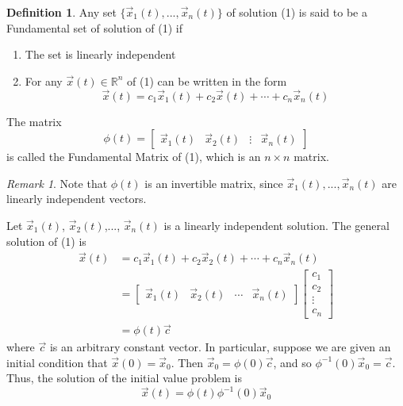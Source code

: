 \documentclass[11pt]{article}
\theoremstyle{definition}\newtheorem{definition}{Definition}
\theoremstyle{definition}\newtheorem{notation}{Notation}
\theoremstyle{definition}\newtheorem{example}{Example}
\theoremstyle{theorem}\newtheorem{theorem}{Theorem}
\theoremstyle{theorem}\newtheorem{corollary}{Corollary}
\theoremstyle{theorem}\newtheorem{proposition}{Proposition}
\theoremstyle{theorem}\newtheorem{lemma}{Lemma}
\theoremstyle{theorem}\newtheorem{question}{Question}
\theoremstyle{remark}\newtheorem{remark}{Remark}
\newcommand{\R}{\mathbb{R}}
\begin{document}
\begin{definition}
    Any set $\{\vec{x}_1(t),..., \vec{x}_n(t)\}$ of solution (1) is said to be a Fundamental set of solution of (1) if
    \begin{enumerate}
        \item The set is linearly independent
        \item For any $\vec{x}(t) \in \R^n$ of (1) can be written in the form
        \begin{equation*}
            \vec{x}(t) = c_1\vec{x}_1(t) + c_2\vec{x}(t) + \cdots + c_n\vec{x}_n(t)
        \end{equation*}
    \end{enumerate}
\end{definition}
The matrix
\begin{equation*}
    \phi(t) = \begin{bmatrix}
        \vec{x}_1(t) & \vec{x}_2(t) & \vdots & \vec{x}_n(t)
    \end{bmatrix}
\end{equation*}
is called the Fundamental Matrix of (1), which is an $n \times n$ matrix.

\begin{remark}
    Note that $\phi(t)$ is an invertible matrix, since $\vec{x}_1(t),..., \vec{x}_n(t)$ are linearly independent vectors.
\end{remark}

Let $\vec{x}_1(t)$, $\vec{x}_2(t)$,..., $\vec{x}_n(t)$ is a linearly independent solution. The general solution of (1) is
\begin{align*}
    \vec{x}(t) &= c_1\vec{x}_1(t) + c_2\vec{x}_2(t) + \cdots + c_n\vec{x}_n(t) \\
    &= \begin{bmatrix} \vec{x}_1(t) & \vec{x}_2(t) & \cdots & \vec{x}_n(t) \end{bmatrix} \begin{bmatrix} c_1 \\ c_2 \\ \vdots \\ c_n \end{bmatrix} \\
    &= \phi(t)\vec{c}
\end{align*}
where $\vec{c}$ is an arbitrary constant vector. In particular, suppose we are given an initial condition that $\vec{x}(0) = \vec{x}_0$. Then $\vec{x}_0 = \phi(0)\vec{c}$, and so $\phi^{-1}(0)\vec{x}_0 = \vec{c}$. Thus, the solution of the initial value problem is
\begin{equation*}
    \vec{x}(t) = \phi(t)\phi^{-1}(0)\vec{x}_0 \tag{*}
\end{equation*}
\end{document}
